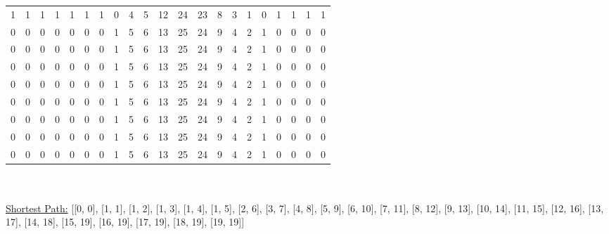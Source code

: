 \documentclass{article}
\begin{document}
\begin{adjustbox}{width=\textwidth,totalheight=\textheight,keepaspectratio}
\begin{tabular}{l|llllllllllllllllllll}
    1       & 1  & 1  & 1  & 1  & 1  & 1  & 0  & 4  & 5  & 12 & 24 & 23 & 8  & 3  & 1  &\cellcolor[HTML]{EFEFEF} 0  & 1  & 1  & 1  & 1  \\
    0         & 0  & 0  & 0  & 0  & 0  & 0  & 1  & 5  & 6  & 13 & 25 & 24 & 9  & 4  & 2  & 1  &\cellcolor[HTML]{EFEFEF} 0  & 0  & 0  & 0  \\
    0         & 0  & 0  & 0  & 0  & 0  & 0  & 1  & 5  & 6  & 13 & 25 & 24 & 9  & 4  & 2  & 1  & 0  &\cellcolor[HTML]{EFEFEF} 0  & 0  & 0  \\
    0         & 0  & 0  & 0  & 0  & 0  & 0  & 1  & 5  & 6  & 13 & 25 & 24 & 9  & 4  & 2  & 1  & 0  & 0  &\cellcolor[HTML]{EFEFEF} 0  & 0  \\
    0         & 0  & 0  & 0  & 0  & 0  & 0  & 1  & 5  & 6  & 13 & 25 & 24 & 9  & 4  & 2  & 1  & 0  & 0  & 0  &\cellcolor[HTML]{EFEFEF} 0  \\
    0         & 0  & 0  & 0  & 0  & 0  & 0  & 1  & 5  & 6  & 13 & 25 & 24 & 9  & 4  & 2  & 1  & 0  & 0  & 0  &\cellcolor[HTML]{EFEFEF} 0  \\
    0         & 0  & 0  & 0  & 0  & 0  & 0  & 1  & 5  & 6  & 13 & 25 & 24 & 9  & 4  & 2  & 1  & 0  & 0  & 0  &\cellcolor[HTML]{EFEFEF} 0  \\
    0         & 0  & 0  & 0  & 0  & 0  & 0  & 1  & 5  & 6  & 13 & 25 & 24 & 9  & 4  & 2  & 1  & 0  & 0  & 0  &\cellcolor[HTML]{EFEFEF} 0  \\
    0         & 0  & 0  & 0  & 0  & 0  & 0  & 1  & 5  & 6  & 13 & 25 & 24 & 9  & 4  & 2  & 1  & 0  & 0  & 0  &\cellcolor[HTML]{EFEFEF} 0  \\
    \end{tabular}
\end{adjustbox}\\
\\
\underline{Shortest Path:} 
[[0, 0], [1, 1], [1, 2], [1, 3], [1, 4], [1, 5], [2, 6], [3, 7], [4, 8], [5, 9], [6, 10], [7, 11], [8, 12], [9, 13], [10, 14], [11, 15], [12, 16], [13, 17], [14, 18], [15, 19], [16, 19], [17, 19], [18, 19], [19, 19]]
\end{document}
